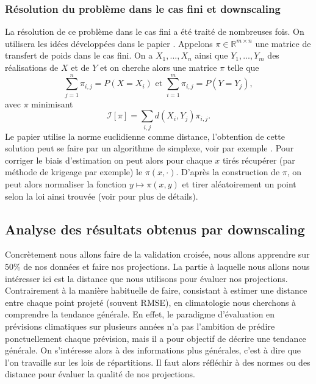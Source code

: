 \documentclass[a4paper,11pt]{article}
\begin{document}
\subsubsection{Résolution du problème dans le cas fini et downscaling}
La résolution de ce problème dans le cas fini a été traité de nombreuses fois. On utilisera les idées développées dans le papier \cite{robin2019multivariate}. Appelons $\pi \in \mathbb{R}^{m\times n}$ une matrice de transfert de poids dans le cas fini. On a $X_1,...,X_n$ ainsi que $Y_1,...,Y_m$ des réalisations de $X$ et de $Y$ et on cherche alors une matrice $\pi$ telle que 
\[\sum_{j=1}^{n} \pi_{i,j}= P(X=X_i) \textrm{ et } \sum_{i=1}^{m} \pi_{i,j}= P(Y=Y_j),\]
avec $\pi$ minimisant 
\[\mathcal{I}[\pi]=\sum_{i,j}d(X_i,Y_j)\pi_{i,j}.\]  
Le papier utilise la norme euclidienne comme distance, l'obtention de cette solution peut se faire par un algorithme de simplexe, voir par exemple \cite{huang2012optimal}. Pour corriger le biais d'estimation on peut alors pour chaque $x$ tirés récupérer (par méthode de krigeage par exemple) le $\pi(x,\cdot)$. D'après la construction de $\pi$, on peut alors normaliser la fonction $y\mapsto \pi(x,y)$ et tirer aléatoirement un point selon la loi ainsi trouvée (voir \cite{robin2019multivariate} pour plus de détails).




\subsection{Analyse des résultats obtenus par downscaling}
\label{analyse-pred}
Concrètement nous allons faire de la validation croisée, nous allons apprendre sur $50\%$ de nos données et faire nos projections. La partie à laquelle nous allons nous intéresser ici est la distance que nous utilisons pour évaluer nos projections. Contrairement à la manière habituelle de faire, consistant à estimer une distance entre chaque point projeté (souvent RMSE), en climatologie nous cherchons à comprendre la tendance générale. En effet, le paradigme d'évaluation en prévisions climatiques sur plusieurs années n'a pas l'ambition de prédire ponctuellement chaque prévision, mais il a pour objectif de décrire une tendance générale. On s'intéresse alors à des informations plus générales, c'est à dire que l'on travaille sur les lois de répartitions. Il faut alors réfléchir à des normes ou des distance pour évaluer la qualité de nos projections.  

\vspace{0.7cm}
\end{document}
